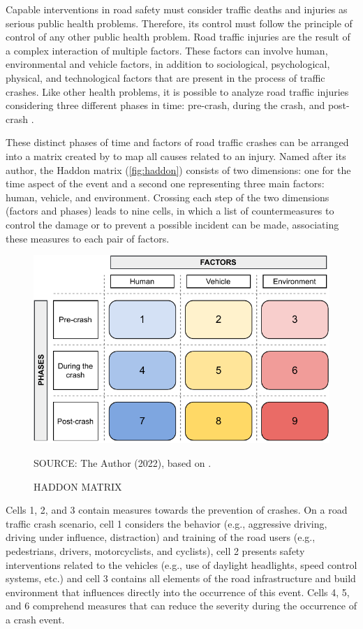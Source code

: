 Capable interventions in road safety must consider traffic deaths and injuries as serious public health problems. Therefore, its control must follow the principle of control of any other public health problem. Road traffic injuries are the result of a complex interaction of multiple factors. These factors can involve human, environmental and vehicle factors, in addition to sociological, psychological, physical, and technological factors that are present in the process of traffic crashes. Like other health problems, it is possible to analyze road traffic injuries considering three different phases in time: pre-crash, during the crash, and post-crash \cite{Mohan2016}.

These distinct phases of time and factors of road traffic crashes can be arranged into a matrix created by \textcite{Haddon1980} to map all causes related to an injury. Named after its author, the Haddon matrix (\autoref{fig:haddon}) consists of two dimensions: one for the time aspect of the event and a second one representing three main factors: human, vehicle, and environment. Crossing each step of the two dimensions (factors and phases) leads to nine cells, in which a list of countermeasures to control the damage or to prevent a possible incident can be made, associating these measures to each pair of factors. 

\begin{figure}[!htbp]
    \centering\footnotesize
    \captionsetup{font=footnotesize}
    \caption{HADDON MATRIX}
    \includegraphics{fig/haddon.pdf}
    \label{fig:haddon}
    \par SOURCE: The Author (2022), based on \textcite{Haddon1980}.
\end{figure} 

Cells 1, 2, and 3 contain measures towards the prevention of crashes. On a road traffic crash scenario, cell 1 considers the behavior (e.g., aggressive driving, driving under influence, distraction) and training of the road users (e.g., pedestrians, drivers, motorcyclists, and cyclists), cell 2 presents safety interventions related to the vehicles (e.g., use of daylight headlights, speed control systems, etc.) and cell 3 contains all elements of the road infrastructure and build environment that influences directly into the occurrence of this event. Cells 4, 5, and 6 comprehend measures that can reduce the severity during the occurrence of a crash event.

